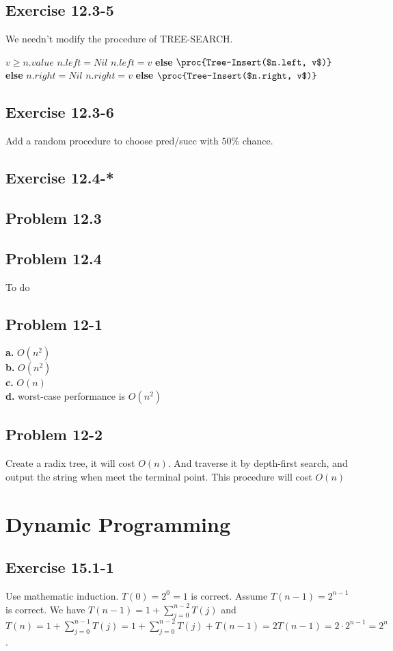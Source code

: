 \documentclass[12pt]{article}
\theoremstyle{definition}
\theoremstyle{remark}
\begin{document}
\subsection*{Exercise 12.3-5}
We needn't modify the procedure of TREE-SEARCH.
\begin{codebox}
\li \If $v\ge n.value$ \label{li:if}
\li \quad \If $n.left=Nil$ \label{li:if}
\li \qquad $n.left=v$
\li \quad \textbf{else}
\li \qquad $\proc{Tree-Insert($n.left, v$)}$
\li \textbf{else}
\li \quad \If $n.right=Nil$ \label{li:if}
\li \qquad $n.right=v$
\li \quad \textbf{else}
\li \qquad $\proc{Tree-Insert($n.right, v$)}$
\end{codebox}
\subsection*{Exercise 12.3-6}
Add a random procedure to choose pred/succ with $50\%$ chance.
\subsection*{Exercise 12.4-*}
\subsection*{Problem 12.3}
\subsection*{Problem 12.4}
To do
\subsection*{Problem 12-1}
\textbf{a.} $O(n^2)$\\
\textbf{b.} $O(n^2)$\\
\textbf{c.} $O(n)$\\
\textbf{d.} worst-case performance is $O(n^2)$
\subsection*{Problem 12-2}
Create a radix tree, it will cost $O(n)$. And traverse it by depth-first search, and output the string when meet the terminal point. This procedure will cost $O(n)$
\section{Dynamic Programming}
\subsection*{Exercise 15.1-1}
Use mathematic induction. $T(0)=2^0=1$ is correct. Assume $T(n-1)=2^{n-1}$ is correct. We have $T(n-1)=1+\sum_{j=0}^{n-2}T(j)$ and $T(n)=1+\sum_{j=0}^{n-1}T(j)=1+\sum_{j=0}^{n-2}T(j)+T(n-1)=2T(n-1)=2\cdot 2^{n-1}=2^n$.
\end{document}
